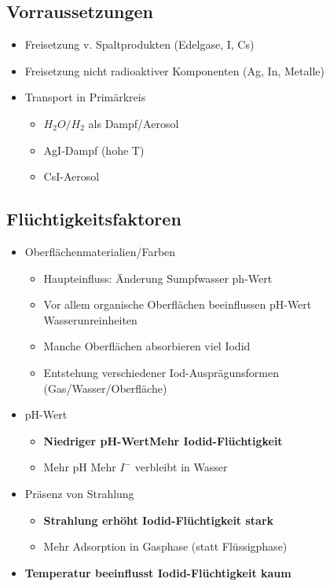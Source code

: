 \documentclass[12pt]{article}
\begin{document}
\subsection{Vorraussetzungen}
\begin{itemize}
	\item Freisetzung v. Spaltprodukten (Edelgase, I, Cs)
	\item Freisetzung nicht radioaktiver Komponenten (Ag, In, Metalle)
	\item Transport in Primärkreis
		\begin{itemize}
			\item \(H_2O/H_2\) als Dampf/Aerosol
			\item AgI-Dampf (hohe T)
			\item CsI-Aerosol
		\end{itemize}
\end{itemize}

\subsection{Flüchtigkeitsfaktoren}
\begin{itemize}
	\item Oberflächenmaterialien/Farben
		\begin{itemize}
			\item Haupteinfluss: Änderung Sumpfwasser ph-Wert
			\item Vor allem organische Oberflächen beeinflussen pH-Wert \textrightarrow Wasserunreinheiten
			\item Manche Oberflächen absorbieren viel Iodid
			\item Entstehung verschiedener Iod-Ausprägunsformen (Gas/Wasser/Oberfläche)
		\end{itemize}
	\item pH-Wert
		\begin{itemize}
			\item \textbf{Niedriger pH-Wert\textrightarrow Mehr Iodid-Flüchtigkeit}
			\item Mehr pH \textrightarrow Mehr \(I^-\) verbleibt in Wasser
		\end{itemize}
	\item Präsenz von Strahlung
		\begin{itemize}
			\item \textbf{Strahlung erhöht Iodid-Flüchtigkeit stark}
			\item Mehr Adsorption in Gasphase (statt Flüssigphase)
		\end{itemize}
	\item \textbf{Temperatur beeinflusst Iodid-Flüchtigkeit kaum}
\end{itemize}
\end{document}

